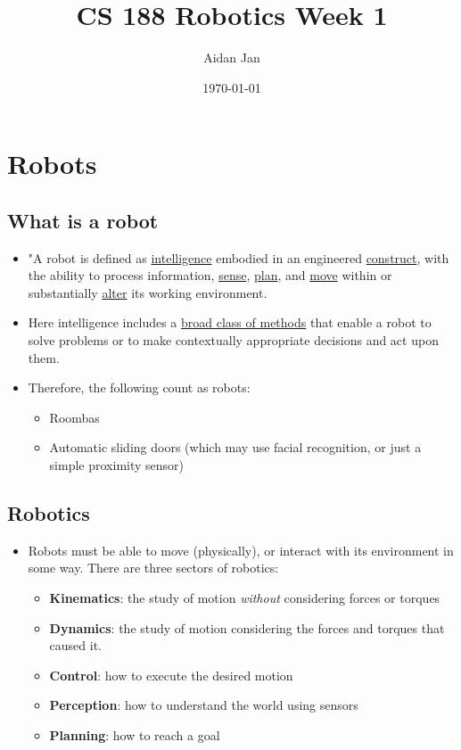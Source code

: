 \documentclass[10pt]{article}
\title{CS 188 Robotics Week 1}
\author{Aidan Jan}
\date{\today}
\begin{document}
\maketitle 

\section*{Robots}
\subsection*{What is a robot}
\begin{itemize}
    \item "A robot is defined as \underline{intelligence} embodied in an engineered \underline{construct}, with the ability to process information, \underline{sense}, \underline{plan}, and \underline{move} within or substantially \underline{alter} its working environment.
    \item Here intelligence includes a \underline{broad class of methods} that enable a robot to solve problems or to make contextually appropriate decisions and act upon them.
    \item Therefore, the following count as robots:
    \begin{itemize}
        \item Roombas
        \item Automatic sliding doors (which may use facial recognition, or just a simple proximity sensor)
    \end{itemize}
\end{itemize}

\subsection*{Robotics}
\begin{itemize}
    \item Robots must be able to move (physically), or interact with its environment in some way.  There are three sectors of robotics:
    \begin{itemize}
        \item \textbf{Kinematics}: the study of motion \textit{without} considering forces or torques
        \item \textbf{Dynamics}: the study of motion considering the forces and torques that caused it.
        \item \textbf{Control}: how to execute the desired motion
        \item \textbf{Perception}: how to understand the world using sensors
        \item \textbf{Planning}: how to reach a goal
    \end{itemize}
\end{itemize}
\end{document}
